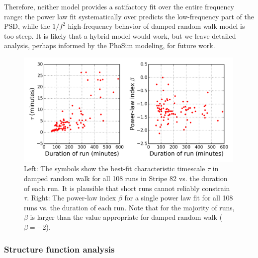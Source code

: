 Therefore, neither model provides a satifactory fit over the entire frequency range: 
the power law fit systematically over predicts the low-frequency part of the PSD,
while the $1/f^2$ high-frequency behavior of damped random walk model is too 
steep. It is likely that a hybrid model would work, but we leave detailed analysis,
perhaps informed by the PhoSim modeling, for future work. 


\begin{figure}[th]
\centering
\includegraphics[width=0.99\textwidth]{FIGURES/taubeta.png}
\vskip -0.2in
\caption{Left: The symbols show the best-fit characteristic timescale $\tau$ in 
damped random walk for all 108 runs in Stripe 82 vs. the duration of 
each run. It is plausible that short runs cannot reliably constrain $\tau$.
Right: The power-law index $\beta$ for a single power law fit for all 108 
runs vs. the duration of each run. Note that for the majority of runs, $\beta$
is larger than the value appropriate for damped random walk ($\beta = -2$). 
\label{fig:hist}}
\end{figure}



\subsubsection{Structure function analysis} 


